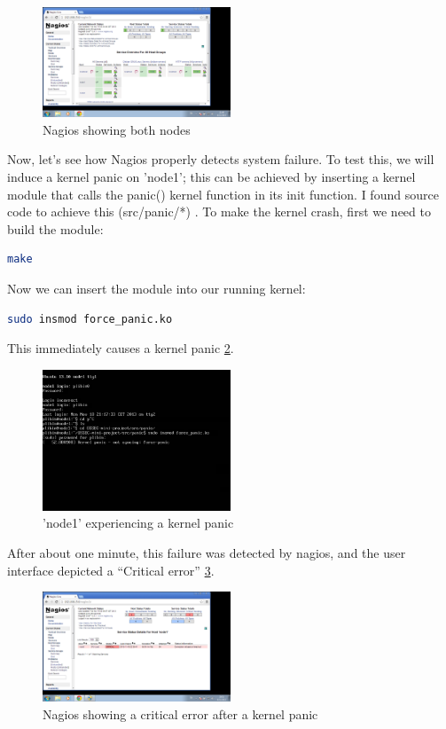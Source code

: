 \documentclass[12pt]{report}
\begin{document}
\begin{figure}[h!]
  \caption{Nagios showing both nodes}
  \label{fig:nagios_nrpe_also_node2}
  \centering
    \includegraphics[width=0.5\textwidth]{pics/nagios_3.png}
\end{figure}

Now, let's see how Nagios properly detects system failure. To test
this, we will induce a kernel panic on 'node1'; this can be achieved
by inserting a kernel module that calls the panic() kernel function in
its init function. I found source code to achieve this (src/panic/*)
\cite{simulate_linux_crash}.
To make the kernel crash, first we need to build the module:
\begin{lstlisting}[language=bash]
 make
\end{lstlisting} 
Now we can insert the module into our running kernel:
\begin{lstlisting}[language=bash]
 sudo insmod force_panic.ko
\end{lstlisting} 
This immediately causes a kernel panic \cref{fig:kernel_panic}.
\begin{figure}[h!]
  \caption{'node1' experiencing a kernel panic}
  \label{fig:kernel_panic}
  \centering
    \includegraphics[width=0.5\textwidth]{pics/kernel_panic.png}
\end{figure}
After about one minute, this failure was detected by nagios, and the
user interface depicted a ``Critical error'' \cref{fig:nagios_after_kernel_panic}.

\begin{figure}[h!]
  \caption{Nagios showing a critical error after a kernel panic}
  \label{fig:nagios_after_kernel_panic}
  \centering
    \includegraphics[width=0.5\textwidth]{pics/nagios_after_kernel_panic.png}
\end{figure}
\end{document}

